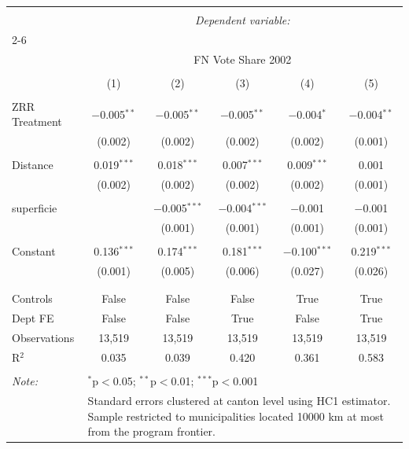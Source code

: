 
\begin{tabular}{@{\extracolsep{3pt}}lccccc} 
\\[-1.8ex]\hline 
\hline \\[-1.8ex] 
 & \multicolumn{5}{c}{\textit{Dependent variable:}} \\ 
\cline{2-6} 
\\[-1.8ex] & \multicolumn{5}{c}{FN Vote Share 2002} \\ 
\\[-1.8ex] & (1) & (2) & (3) & (4) & (5)\\ 
\hline \\[-1.8ex] 
 ZRR Treatment & $-$0.005$^{**}$ & $-$0.005$^{**}$ & $-$0.005$^{**}$ & $-$0.004$^{*}$ & $-$0.004$^{**}$ \\ 
  & (0.002) & (0.002) & (0.002) & (0.002) & (0.001) \\ 
  & & & & & \\ 
 Distance & 0.019$^{***}$ & 0.018$^{***}$ & 0.007$^{***}$ & 0.009$^{***}$ & 0.001 \\ 
  & (0.002) & (0.002) & (0.002) & (0.002) & (0.001) \\ 
  & & & & & \\ 
 superficie &  & $-$0.005$^{***}$ & $-$0.004$^{***}$ & $-$0.001 & $-$0.001 \\ 
  &  & (0.001) & (0.001) & (0.001) & (0.001) \\ 
  & & & & & \\ 
 Constant & 0.136$^{***}$ & 0.174$^{***}$ & 0.181$^{***}$ & $-$0.100$^{***}$ & 0.219$^{***}$ \\ 
  & (0.001) & (0.005) & (0.006) & (0.027) & (0.026) \\ 
  & & & & & \\ 
\hline \\[-1.8ex] 
Controls & False & False & False & True & True \\ 
Dept FE & False & False & True & False & True \\ 
Observations & 13,519 & 13,519 & 13,519 & 13,519 & 13,519 \\ 
R$^{2}$ & 0.035 & 0.039 & 0.420 & 0.361 & 0.583 \\ 
\hline 
\hline \\[-1.8ex] 
\textit{Note:}  & \multicolumn{5}{l}{$^{*}$p$<$0.05; $^{**}$p$<$0.01; $^{***}$p$<$0.001} \\ 
 & \multicolumn{5}{l}{Standard errors clustered at canton level using HC1 estimator. Sample restricted to municipalities located 10000 km at most from the program frontier.} \\ 
\end{tabular} 
